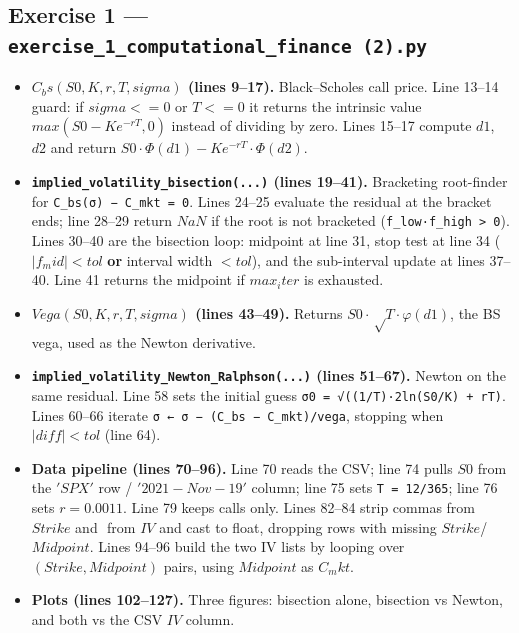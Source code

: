 \documentclass[
  11pt,
]{article}
\providecommand{\tightlist}{%
  \setlength{\itemsep}{0pt}\setlength{\parskip}{0pt}}
\begin{document}
\hypertarget{exercise-1-exercise_1_computational_finance-2.py}{%
\subsection{\texorpdfstring{Exercise 1 ---
\texttt{exercise\_1\_computational\_finance\ (2).py}}{Exercise 1 --- exercise\_1\_computational\_finance (2).py}}\label{exercise-1-exercise_1_computational_finance-2.py}}

\begin{itemize}
\tightlist
\item
  \textbf{\(C_bs(S0,K,r,T,sigma)\) (lines 9--17).} Black--Scholes call
  price. Line 13--14 guard: if \(sigma<=0\) or \(T<=0\) it returns the
  intrinsic value \(max(S0 − K e^{−rT}, 0)\) instead of dividing by
  zero. Lines 15--17 compute \(d1\), \(d2\) and return
  \(S0·Φ(d1) − K e^{−rT}·Φ(d2)\).
\item
  \textbf{\texttt{implied\_volatility\_bisection(...)} (lines 19--41).}
  Bracketing root-finder for \texttt{C\_bs(σ)\ −\ C\_mkt\ =\ 0}. Lines
  24--25 evaluate the residual at the bracket ends; line 28--29 return
  \(NaN\) if the root is not bracketed
  (\texttt{f\_low·f\_high\ \textgreater{}\ 0}). Lines 30--40 are the
  bisection loop: midpoint at line 31, stop test at line 34
  (\(|f_mid| < tol\) \textbf{or} interval width \(< tol\)), and the
  sub-interval update at lines 37--40. Line 41 returns the midpoint if
  \(max_iter\) is exhausted.
\item
  \textbf{\(Vega(S0,K,r,T,sigma)\) (lines 43--49).} Returns
  \(S0·√T·φ(d1)\), the BS vega, used as the Newton derivative.
\item
  \textbf{\texttt{implied\_volatility\_Newton\_Ralphson(...)} (lines
  51--67).} Newton on the same residual. Line 58 sets the initial guess
  \texttt{σ0\ =\ √((1/T)·2\textbar{}ln(S0/K)\ +\ rT\textbar{})}. Lines
  60--66 iterate \texttt{σ\ ←\ σ\ −\ (C\_bs\ −\ C\_mkt)/vega}, stopping
  when \(|diff| < tol\) (line 64).
\item
  \textbf{Data pipeline (lines 70--96).} Line 70 reads the CSV; line 74
  pulls \(S0\) from the \('SPX'\) row / \('2021-Nov-19'\) column; line
  75 sets \texttt{T\ =\ 12/365}; line 76 sets \(r = 0.0011\). Line 79
  keeps calls only. Lines 82--84 strip commas from \(Strike\) and \(%
  \) from \(IV\) and cast to float, dropping rows with missing
  \(Strike\)/\(Midpoint\). Lines 94--96 build the two IV lists by
  looping over \((Strike, Midpoint)\) pairs, using \(Midpoint\) as
  \(C_mkt\).
\item
  \textbf{Plots (lines 102--127).} Three figures: bisection alone,
  bisection vs Newton, and both vs the CSV \(IV\) column.
\end{itemize}
\end{document}
